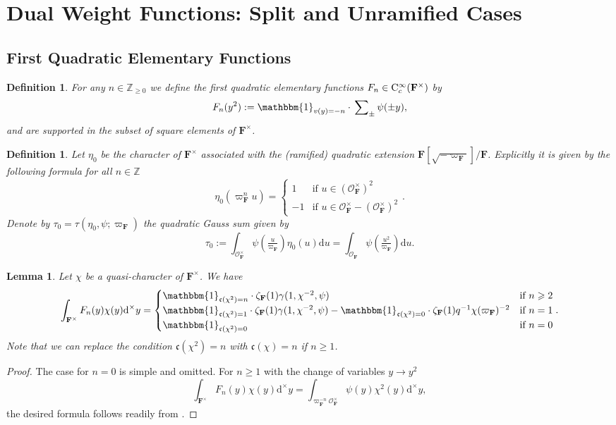 \documentclass[A4]{amsart}
\def\geq{\geqslant}
\newtheorem{definition} [theorem] {Definition}
\newtheorem{lemma}      [theorem]{Lemma}
\numberwithin{equation}{section} \everymath{\displaystyle}
\newcommand{\Cont}{{\rm C}}
\newcommand{\Z}{\mathbb{Z}}
\newcommand{\id}{\mathbbm{1}}
\newcommand{\ud}{\mathrm{d}}
\newcommand{\F}{\mathbf{F}}
\newcommand{\vO}{\mathcal{O}}
\newcommand{\cond}{\mathfrak{c}}
\begin{document}
\section{Dual Weight Functions: Split and Unramified Cases}


	\subsection{First Quadratic Elementary Functions}
	
\begin{definition} \label{def: QEleF1}
	For any $n \in \Z_{\geq 0}$ we define the \emph{first quadratic elementary functions} $F_n \in \Cont_c^{\infty}(\F^{\times})$ by 
	$$ F_n(y^2) := \id_{v(y)=-n} \cdot \sideset{}{_{\pm}} \sum \psi(\pm y), $$
	and are supported in the subset of \emph{square} elements of $\F^{\times}$.
\end{definition}

\begin{definition} \label{def: QGSum}
	Let $\eta_0$ be the character of $\F^{\times}$ associated with the (ramified) quadratic extension $\F[\sqrt{-\varpi_{\F}}]/\F$. Explicitly it is given by the following formula for all $n \in \Z$
	$$ \eta_0(\varpi_{\F}^n u) = \begin{cases}
		1 & \text{if } u \in (\vO_{\F}^{\times})^2 \\
		-1 & \text{if } u \in \vO_{\F}^{\times} - (\vO_{\F}^{\times})^2
	\end{cases}. $$
	Denote by $\tau_0 = \tau(\eta_0, \psi; \varpi_{\F})$ the \emph{quadratic Gauss sum} given by
	$$ \tau_0 := \int_{\vO_{\F}^{\times}} \psi \left( \tfrac{u}{\varpi_{\F}} \right) \eta_0(u) \ud u = \int_{\vO_{\F}} \psi \left( \tfrac{u^2}{\varpi_{\F}} \right) \ud u. $$
\end{definition}

\begin{lemma} \label{lem: MellinQEleF1}
	Let $\chi$ be a quasi-character of $\F^{\times}$. We have
	$$ \int_{\F^{\times}} F_n(y) \chi(y) \ud^{\times} y = \begin{cases}
		\id_{\cond(\chi^2)=n} \cdot \zeta_{\F}(1) \gamma(1,\chi^{-2},\psi) & \text{if } n \geq 2 \\
		\id_{\cond(\chi^2)=1} \cdot \zeta_{\F}(1) \gamma(1,\chi^{-2},\psi) - \id_{\cond(\chi^2)=0} \cdot \zeta_{\F}(1) q^{-1} \chi(\varpi_{\F})^{-2} & \text{if } n = 1 \\
		\id_{\cond(\chi^2)=0} & \text{if } n = 0
	\end{cases}. $$
	Note that we can replace the condition $\cond(\chi^2)=n$ with $\cond(\chi)=n$ if $n \geq 1$.
\end{lemma}
\begin{proof}
	The case for $n=0$ is simple and omitted. For $n \geq 1$ with the change of variables $y \to y^2$
	$$ \int_{\F^{\times}} F_n(y) \chi(y) \ud^{\times} y = \int_{\varpi_{\F}^{-n} \vO_{\F}^{\times}} \psi(y) \chi^2(y) \ud^{\times} y, $$
	the desired formula follows readily from \cite[Exercise 23.5]{BuH06}.
\end{proof}
\end{document}
